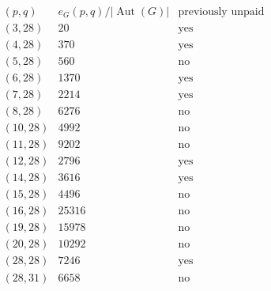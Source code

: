\[\begin{array}{c|rr}
(p,q)&e_G(p,q)/|\operatorname{Aut}(G)|&\text{previously unpaid}\\\hline
(3,28)&20&\text{yes}\\
(4,28)&370&\text{yes}\\
(5,28)&560&\text{no}\\
(6,28)&1370&\text{yes}\\
(7,28)&2214&\text{yes}\\
(8,28)&6276&\text{no}\\
(10,28)&4992&\text{no}\\
(11,28)&9202&\text{no}\\
(12,28)&2796&\text{yes}\\
(14,28)&3616&\text{yes}\\
(15,28)&4496&\text{no}\\
(16,28)&25316&\text{no}\\
(19,28)&15978&\text{no}\\
(20,28)&10292&\text{no}\\
(28,28)&7246&\text{yes}\\
(28,31)&6658&\text{no}\\
\end{array}\]
